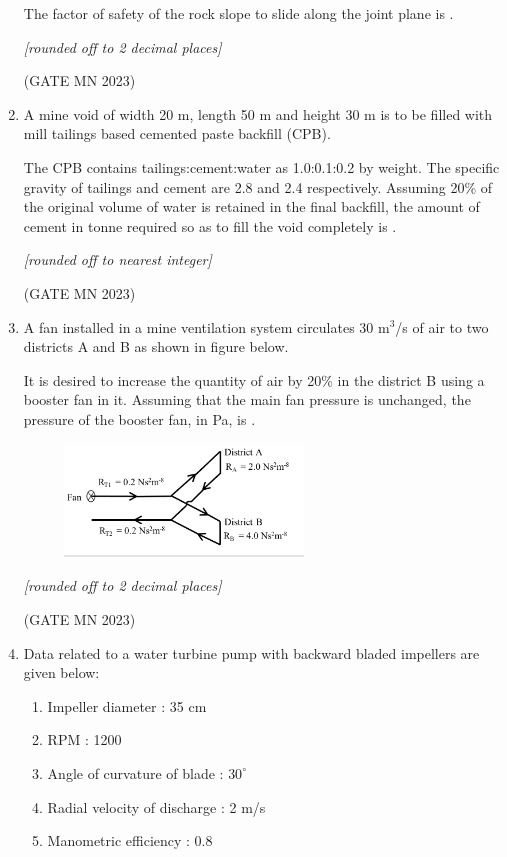 \documentclass[journal]{IEEEtran}
\begin{document}
\begin{enumerate}
The factor of safety of the rock slope to slide along the joint plane is \underline{\hspace{2cm}}.  

\textit{[rounded off to 2 decimal places]}  

\hfill(GATE MN 2023)


\item A mine void of width 20 m, length 50 m and height 30 m is to be filled with mill tailings based cemented paste backfill (CPB).  

The CPB contains tailings:cement:water as 1.0:0.1:0.2 by weight. The specific gravity of tailings and cement are 2.8 and 2.4 respectively. Assuming 20\% of the original volume of water is retained in the final backfill, the amount of cement in tonne required so as to fill the void completely is \underline{\hspace{2cm}}.  

\textit{[rounded off to nearest integer]}  


\hfill(GATE MN 2023)

\item A fan installed in a mine ventilation system circulates 30 m$^3$/s of air to two districts A and B as shown in figure below.  

It is desired to increase the quantity of air by 20\% in the district B using a booster fan in it. Assuming that the main fan pressure is unchanged, the pressure of the booster fan, in Pa, is \underline{\hspace{2cm}}.  


    \begin{figure}[H]
    \centering
\includegraphics[width=0.6\textwidth]{Screenshot_2025_0822_133511.png}
\caption{}
    \label{fig:Q64}
\end{figure}

\textit{[rounded off to 2 decimal places]}  


\hfill(GATE MN 2023)
\item Data related to a water turbine pump with backward bladed impellers are given below:

    \begin{enumerate}
        \item Impeller diameter : 35 cm
        \item RPM : 1200
        \item Angle of curvature of blade : $30^\circ$
        \item Radial velocity of discharge : 2 m/s
        \item Manometric efficiency : 0.8
    \end{enumerate}


\end{enumerate}
\end{document}
